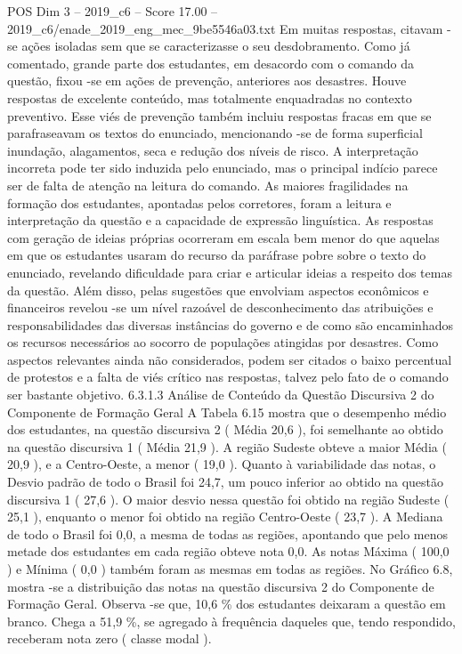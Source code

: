 \begin{textsample}{POS Dim 3 – 2019\_c6 – Score 17.00 – 2019\_c6/enade\_2019\_eng\_mec\_9be5546a03.txt}
Em muitas respostas, citavam -se ações isoladas sem que se caracterizasse o seu desdobramento.
Como já comentado, grande parte dos estudantes, em desacordo com o comando da questão, fixou -se em ações de prevenção, anteriores aos desastres.
Houve respostas de excelente conteúdo, mas totalmente enquadradas no contexto preventivo.
Esse viés de prevenção também incluiu respostas fracas em que se parafraseavam os textos do enunciado, mencionando -se de forma superficial inundação, alagamentos, seca e redução dos níveis de risco.
A interpretação incorreta pode ter sido induzida pelo enunciado, mas o principal indício parece ser de falta de atenção na leitura do comando.
As maiores fragilidades na formação dos estudantes, apontadas pelos corretores, foram a leitura e interpretação da questão e a capacidade de expressão linguística.
As respostas com geração de ideias próprias ocorreram em escala bem menor do que aquelas em que os estudantes usaram do recurso da paráfrase pobre sobre o texto do enunciado, revelando dificuldade para criar e articular ideias a respeito dos temas da questão.
Além disso, pelas sugestões que envolviam aspectos econômicos e financeiros revelou -se um nível razoável de desconhecimento das atribuições e responsabilidades das diversas instâncias do governo e de como são encaminhados os recursos necessários ao socorro de populações atingidas por desastres.
Como aspectos relevantes ainda não considerados, podem ser citados o baixo percentual de protestos e a falta de viés crítico nas respostas, talvez pelo fato de o comando ser bastante objetivo. 6.3.1.3 Análise de Conteúdo da Questão Discursiva 2 do Componente de Formação Geral A Tabela 6.15 mostra que o desempenho médio dos estudantes, na questão discursiva 2 ( Média 20,6 ), foi semelhante ao obtido na questão discursiva 1 ( Média 21,9 ).
A região Sudeste obteve a maior Média ( 20,9 ), e a Centro-Oeste, a menor ( 19,0 ).
Quanto à variabilidade das notas, o Desvio padrão de todo o Brasil foi 24,7, um pouco inferior ao obtido na questão discursiva 1 ( 27,6 ).
O maior desvio nessa questão foi obtido na região Sudeste ( 25,1 ), enquanto o menor foi obtido na região Centro-Oeste ( 23,7 ).
A Mediana de todo o Brasil foi 0,0, a mesma de todas as regiões, apontando que pelo menos metade dos estudantes em cada região obteve nota 0,0.
As notas Máxima ( 100,0 ) e Mínima ( 0,0 ) também foram as mesmas em todas as regiões.
No Gráfico 6.8, mostra -se a distribuição das notas na questão discursiva 2 do Componente de Formação Geral.
Observa -se que, 10,6 \% dos estudantes deixaram a questão em branco.
Chega a 51,9 \%, se agregado à frequência daqueles que, tendo respondido, receberam nota zero ( classe modal ).

\end{textsample}
